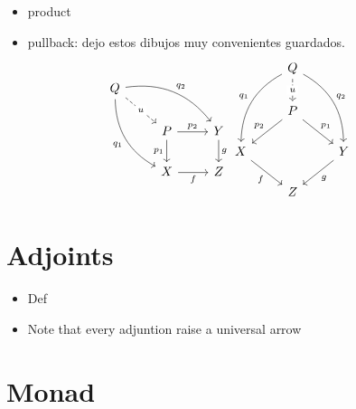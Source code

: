 \begin{itemize}
\item product \label{prod-univ}
\item pullback: dejo estos dibujos muy convenientes guardados.
  $$
\begin{tikzcd}
Q
\arrow[bend left]{drr}{q_2}
\arrow[bend right,swap]{ddr}{q_1}
\arrow[dashed]{dr}[description]{u} & & \\
& P \arrow{r}{p_2} \arrow{d}[swap]{p_1}
& Y \arrow{d}{g} \\
& X \arrow[swap]{r}{f}
& Z
\end{tikzcd}

\begin{tikzcd}
{} & Q
\arrow[bend right,swap]{ddl}{q_1}
\arrow[bend left]{ddr}{q_2}
\arrow[dashed]{d}[description]{u} & & \\
& P \arrow{dr}{p_1} \arrow{dl}[swap]{p_2} \\
X \arrow[swap]{dr}{f} & & 
Y \arrow{dl}{g} \\
& Z
\end{tikzcd}
  $$
\end{itemize}
\section{Adjoints}


\begin{itemize}
\item Def
\item Note that every adjuntion raise a universal arrow
\end{itemize}

\section{Monad}